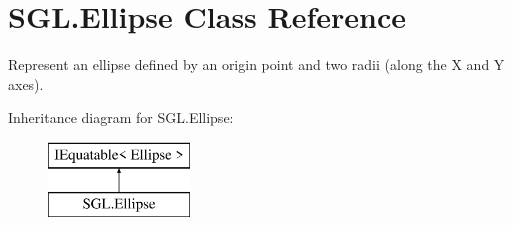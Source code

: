 \hypertarget{class_s_g_l_1_1_ellipse}{}\section{S\+G\+L.\+Ellipse Class Reference}
\label{class_s_g_l_1_1_ellipse}


Represent an ellipse defined by an origin point and two radii (along the X and Y axes).  


Inheritance diagram for S\+G\+L.\+Ellipse\+:\begin{figure}[H]
\begin{center}
\leavevmode
\includegraphics[height=2.000000cm]{class_s_g_l_1_1_ellipse}
\end{center}
\end{figure}
